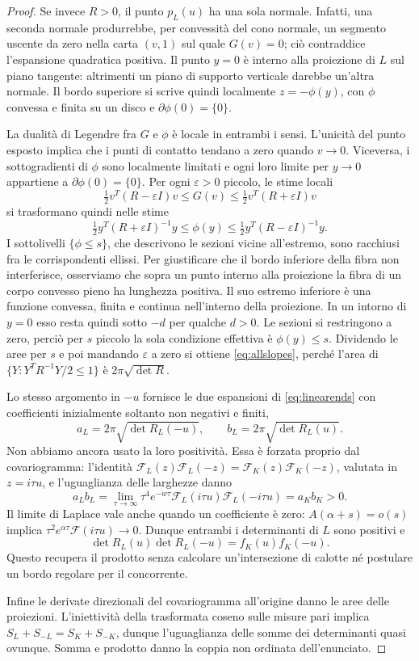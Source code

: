 \documentclass[11pt,a4paper]{article}
\theoremstyle{remark}
\begin{document}
\begin{proof}
Se invece $R>0$, il punto $p_L(u)$ ha una sola normale. Infatti, una
seconda normale produrrebbe, per convessità del cono normale, un
segmento uscente da zero nella carta $(v,1)$ sul quale $G(v)=0$;
ciò contraddice l'espansione quadratica positiva. Il punto $y=0$ è
interno alla proiezione di $L$ sul piano tangente: altrimenti un
piano di supporto verticale darebbe un'altra normale. Il bordo
superiore si scrive quindi localmente $z=-\phi(y)$, con $\phi$
convessa e finita su un disco e $\partial\phi(0)=\{0\}$.

La dualità di Legendre fra $G$ e $\phi$ è locale in entrambi i sensi.
L'unicità del punto esposto implica che i punti di contatto tendano
a zero quando $v\to0$. Viceversa, i sottogradienti di $\phi$ sono
localmente limitati e ogni loro limite per $y\to0$ appartiene a
$\partial\phi(0)=\{0\}$. Per ogni $\varepsilon>0$ piccolo,
le stime locali
\[
\tfrac12 v^T(R-\varepsilon I)v\leq G(v)
\leq\tfrac12 v^T(R+\varepsilon I)v
\]
si trasformano quindi nelle stime
\[
\tfrac12 y^T(R+\varepsilon I)^{-1}y\leq\phi(y)
\leq\tfrac12 y^T(R-\varepsilon I)^{-1}y.
\]
I sottolivelli $\{\phi\leq s\}$, che descrivono le sezioni vicine
all'estremo, sono racchiusi fra le corrispondenti ellissi.
Per giustificare che il bordo inferiore della fibra non interferisce,
osserviamo che sopra un punto interno alla proiezione la fibra di un
corpo convesso pieno ha lunghezza positiva. Il suo estremo inferiore
è una funzione convessa, finita e continua nell'interno della
proiezione. In un intorno di $y=0$ esso resta quindi sotto $-d$ per
qualche $d>0$. Le sezioni si restringono a zero, perciò per $s$ piccolo
la sola condizione effettiva è $\phi(y)\leq s$. Dividendo
le aree per $s$ e poi mandando $\varepsilon$ a zero si ottiene
\eqref{eq:allslopes}, perché l'area di
$\{Y:Y^TR^{-1}Y/2\leq1\}$ è $2\pi\sqrt{\det R}$.

Lo stesso argomento in $-u$ fornisce le due espansioni di
\eqref{eq:linearends} con
coefficienti inizialmente soltanto non negativi e finiti,
\[
a_L=2\pi\sqrt{\det R_L(-u)},\qquad
b_L=2\pi\sqrt{\det R_L(u)}.
\]
Non abbiamo ancora usato la loro positività. Essa è forzata proprio
dal covariogramma: l'identità
$\mathcal F_L(z)\mathcal F_L(-z)=\mathcal F_K(z)\mathcal F_K(-z)$,
valutata in $z=i\tau u$, e l'uguaglianza delle larghezze danno
\begin{equation}\label{eq:laplaceproduct}
a_Lb_L
=\lim_{\tau\to\infty}\tau^4e^{-w\tau}
  \mathcal F_L(i\tau u)\mathcal F_L(-i\tau u)
=a_Kb_K>0.
\end{equation}
Il limite di Laplace vale anche quando un coefficiente è zero:
$A(\alpha+s)=o(s)$ implica
$\tau^2 e^{\alpha\tau}\mathcal F(i\tau u)\to0$.
Dunque entrambi i determinanti di $L$ sono positivi e
\[
\det R_L(u)\det R_L(-u)=f_K(u)f_K(-u).
\]
Questo recupera il prodotto senza calcolare un'intersezione di calotte
né postulare un bordo regolare per il concorrente.

Infine le derivate direzionali del covariogramma all'origine danno le
aree delle proiezioni. L'iniettività della trasformata coseno sulle
misure pari implica $S_L+S_{-L}=S_K+S_{-K}$, dunque l'uguaglianza
delle somme dei determinanti quasi ovunque. Somma e prodotto danno
la coppia non ordinata dell'enunciato.
\end{proof}
\end{document}
